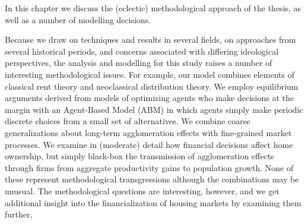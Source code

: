 


In this chapter we discuss the (eclectic) methodological approach of the thesis, as well as a number of modelling decisions. 

Because we draw on techniques and results in several fields, on approaches from several historical periods, and  concerns associated with differing ideological perspectives,  the analysis and modelling for this study raises a number of interesting methodological issues. For example, our model combines elements  of classical rent theory and neoclassical distribution theory. We employ equilibrium arguments derived from models of optimizing agents who make decisions at the margin  with an Agent-Based Model (ABM) in which agents simply make periodic discrete choices from  a small set of alternatives. We combine coarse generalizations about long-term agglomeration effects with fine-grained market processes. We examine in (moderate) detail how financial decisions affect home ownership, but simply black-box  the transmission of  agglomeration effects through firms  from aggregate productivity gains to population growth.
None of these represent methodological transgressions although the combinations may be unusual. The methodological questions are interesting, however, and we get additional insight into the financialization of housing markets by examining them further,   

